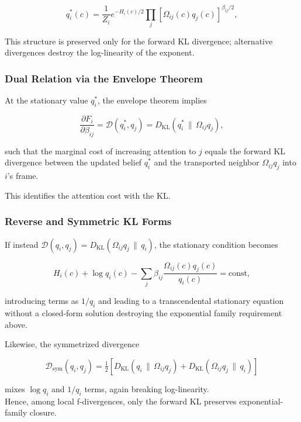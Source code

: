 \documentclass[11pt]{article}
\begin{document}
\begin{equation}
q_i^*(c)
= \frac{1}{Z_i}
e^{-H_i(c)/2}
\prod_j
[\Omega_{ij}(c) q_j(c)]^{\beta_{ij}/2},
\label{eq:q_i_star}
\end{equation}

This structure is preserved only for the forward KL divergence; alternative divergences destroy the log-linearity of the exponent.

\subsubsection{Dual Relation via the Envelope Theorem}
At the stationary value $q_i^*$, the envelope theorem implies

\begin{equation}
\frac{\partial F_i}{\partial \beta_{ij}}
= \mathcal{D}(q_i^*, q_j)
= D_{\mathrm{KL}}(q_i^* \,\|\, \Omega_{ij} q_j),
\label{eq:envelope}
\end{equation}

such that the marginal cost of increasing attention to $j$ equals the forward KL divergence between the updated belief $q_i^*$ and the transported neighbor $\Omega_{ij} q_j$ into $i$'s frame.

This identifies the attention cost with the KL.

\subsubsection{Reverse and Symmetric KL Forms}
If instead $\mathcal{D}(q_i,q_j) = D_{\mathrm{KL}}(\Omega_{ij}q_j \,\|\, q_i)$, the stationary condition becomes

\begin{equation}
H_i(c)
+ \log q_i(c)
- \sum_j \beta_{ij}
\frac{\Omega_{ij}(c) q_j(c)}{q_i(c)}
= \text{const},
\end{equation}

introducing terms as $1/q_i$ and leading to a transcendental stationary equation without a closed-form solution destroying the exponential family requirement above.

Likewise, the symmetrized divergence

\[
\mathcal{D}_{\mathrm{sym}}(q_i,q_j)
= \tfrac{1}{2}\!\left[
D_{\mathrm{KL}}(q_i \,\|\, \Omega_{ij} q_j)
+ D_{\mathrm{KL}}(\Omega_{ij} q_j \,\|\, q_i)
\right]
\]

mixes $\log q_i$ and $1/q_i$ terms, again breaking log-linearity.\\
Hence, among local f-divergences, only the forward KL preserves exponential-family closure.
\end{document}
